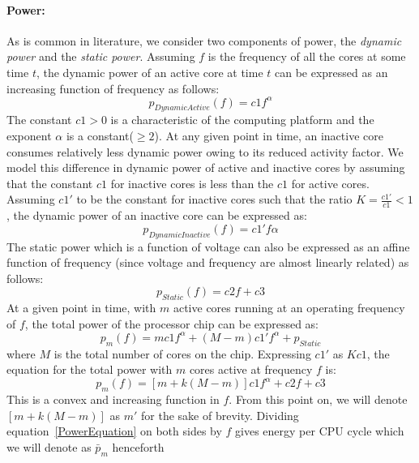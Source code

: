 \documentclass[11pt, letterpaper]{article}
\begin{document}
\paragraph{Power:}
As is common in literature, we consider two components of power, the \emph{dynamic power} and the \emph{static power}. Assuming $f$ is the frequency of all the cores at some time $t$, the dynamic power of an active core at time $t$ can be expressed as an increasing function of frequency as follows:
\begin{displaymath}
 p_{DynamicActive}(f) = c1f^{\alpha}
\end{displaymath}
The constant $c1 > 0$ is a characteristic of the computing platform and the exponent $\alpha$ is a constant($\geq 2$).
At any given point in time, an inactive core consumes relatively less dynamic power owing to its reduced activity factor. We model this difference in dynamic power of active and inactive cores by assuming that the constant $c1$ for inactive cores is less than the $c1$ for active cores.
Assuming $c1'$ to be the constant for inactive cores such that the ratio $K = \frac{c1'}{c1} < 1$, the dynamic power of an inactive core can be expressed as:
\begin{displaymath}
 p_{DynamicInactive}(f) = c1'f{\alpha}
\end{displaymath}
The static power which is a function of voltage can also be expressed as an affine function of frequency (since voltage and frequency are almost linearly related) as follows:
\begin{displaymath}
 p_{Static}(f) = c2f + c3
\end{displaymath}
At a given point in time, with $m$ active cores running at an operating frequency of $f$, the total power of the processor chip can be expressed as:
\begin{displaymath}
 p_m(f) = m c1f^{\alpha} + (M-m)c1'f^{\alpha} +  p_{Static}
\end{displaymath}
where $M$ is the total number of cores on the chip.
Expressing $c1'$ as $Kc1$, the equation for the total power with $m$ cores active at frequency $f$ is:
\begin{equation}\label{PowerEquation}
 p_m(f) = [m + k(M-m)]c1f^{\alpha} + c2f + c3
\end{equation}
This is a convex and increasing function in $f$. From this point on, we will denote $[m + k(M-m)]$ as $m'$ for the sake of brevity. 
Dividing equation~\ref{PowerEquation} on both sides by $f$ gives energy per CPU cycle which we will denote as  $\bar{p}_m$ henceforth
\end{document}
